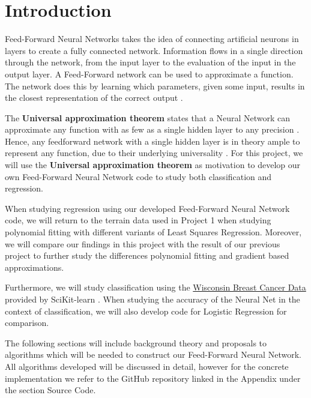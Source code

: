 \documentclass
[twocolumn,
secnumarabic,
nobibnotes,
aps,
prl,
reprint,
groupedaddress,
amsmath,
amssymb
]{revtex4-2}
\begin{document}
\maketitle

\section{Introduction}
Feed-Forward Neural Networks takes the idea of connecting artificial neurons in layers to create a fully connected network. Information flows in a single direction through the network, from the input layer to the evaluation of the input in the output layer. A Feed-Forward network can be used to approximate a function. The network does this by learning which parameters, given some input, results in the closest representation of the correct output \cite{Goodfellow2016}.

The \textbf{Universal approximation theorem} states that a Neural Network can approximate any function with as few as a single hidden layer to any precision \cite{Hornik1989, Cybenko1989}. Hence, any feedforward network with a single hidden layer is in theory ample to represent any function, due to their underlying universality \cite{Nielsen2015}. For this project, we will use the \textbf{Universal approximation theorem} as motivation to develop our own Feed-Forward Neural Network code to study both classification and regression.

When studying regression using our developed Feed-Forward Neural Network code, we will return to the terrain data used in Project 1 when studying polynomial fitting with different variants of Least Squares Regression. Moreover, we will compare our findings in this project with the result of our previous project to further study the differences polynomial fitting and gradient based approximations.

Furthermore, we will study classification using the \href{https://www.kaggle.com/uciml/breast-cancer-wisconsin-data}{Wisconsin Breast Cancer Data} provided by SciKit-learn \cite{scikit-learn}. When studying the accuracy of the Neural Net in the context of classification, we will also develop code for Logistic Regression for comparison.

The following sections will include background theory and proposals to algorithms which will be needed to construct our Feed-Forward Neural Network. All algorithms developed will be discussed in detail, however for the concrete implementation we refer to the GitHub repository linked in the Appendix under the section Source Code.
\end{document}
